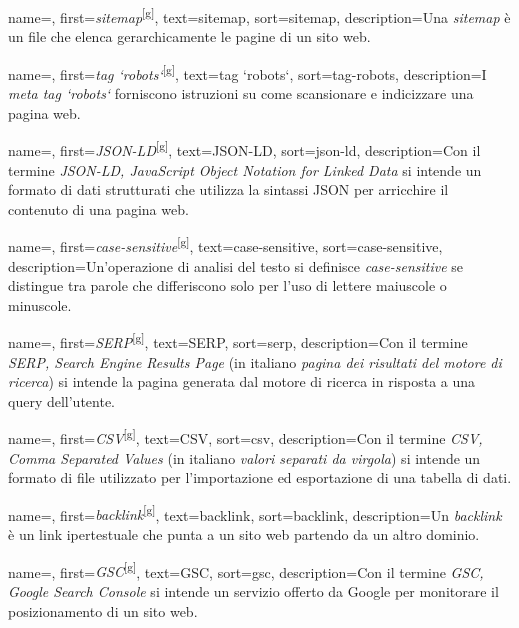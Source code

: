  {
    name=,
    first={\textit{sitemap}\textsuperscript{[g]}},
    text=sitemap,
    sort=sitemap,
    description={Una \textit{sitemap} è un file che elenca gerarchicamente le pagine di un sito web.}
}

 {
    name=,
    first={\textit{tag `robots`}\textsuperscript{[g]}},
    text=tag `robots`,
    sort=tag-robots,
    description={I \textit{meta tag `robots`} forniscono istruzioni su come scansionare e indicizzare una pagina web.}
}

 {
    name=,
    first={\textit{JSON-LD}\textsuperscript{[g]}},
    text=JSON-LD,
    sort=json-ld,
    description={Con il termine \textit{JSON-LD, JavaScript Object Notation for Linked Data} si intende un formato di dati strutturati che utilizza la sintassi JSON per arricchire il contenuto di una pagina web.}
}

 {
    name=,
    first={\textit{case-sensitive}\textsuperscript{[g]}},
    text=case-sensitive,
    sort=case-sensitive,
    description={Un'operazione di analisi del testo si definisce \textit{case-sensitive} se distingue tra parole che differiscono solo per l'uso di lettere maiuscole o minuscole.}
}

 {
    name=,
    first={\textit{SERP}\textsuperscript{[g]}},
    text=SERP,
    sort=serp,
    description={Con il termine \textit{SERP, Search Engine Results Page} (in italiano \textit{pagina dei risultati del motore di ricerca}) si intende la pagina generata dal motore di ricerca in risposta a una query dell'utente.}
}

 {
    name=,
    first={\textit{CSV}\textsuperscript{[g]}},
    text=CSV,
    sort=csv,
    description={Con il termine \textit{CSV, Comma Separated Values} (in italiano \textit{valori separati da virgola}) si intende un formato di file utilizzato per l'importazione ed esportazione di una tabella di dati.}
}

 {
    name=,
    first={\textit{backlink}\textsuperscript{[g]}},
    text=backlink,
    sort=backlink,
    description={Un \textit{backlink} è un link ipertestuale che punta a un sito web partendo da un altro dominio.}
}

 {
    name=,
    first={\textit{GSC}\textsuperscript{[g]}},
    text=GSC,
    sort=gsc,
    description={Con il termine \textit{GSC, Google Search Console} si intende un servizio offerto da Google per monitorare il posizionamento di un sito web.}
}

